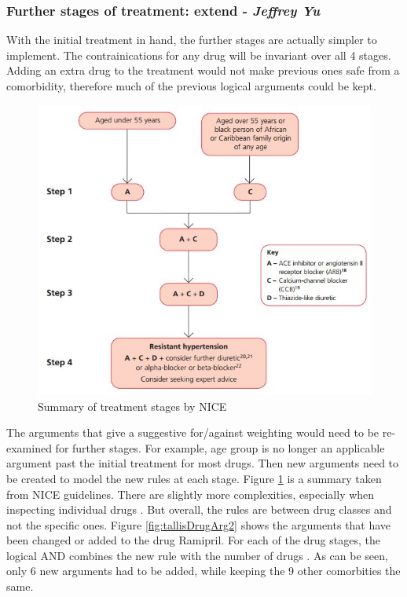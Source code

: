 \documentclass[11pt]{article}
\begin{document}
\clearpage
\subsubsection{Further stages of treatment: extend - \textit{Jeffrey Yu}}  
With the initial treatment in hand, the further stages are actually simpler to implement.  The contrainications for any drug will be invariant over all 4 stages.  Adding an extra drug to the treatment would not make previous ones safe from a comorbidity, therefore much of the previous logical arguments could be kept.

\begin{figure}[ht]
\begin{center}
\includegraphics[scale=0.8]{tallisNewDrug}
\caption{Summary of treatment stages by NICE \cite{NICE}}
\label{fig:tallisNewDrug}
\end{center}
\end{figure}

The arguments that give a suggestive for/against weighting would need to be re-examined for further stages.  For example, age group is no longer an applicable argument past the initial treatment for most drugs.  Then new arguments need to be created to model the new rules at each stage. Figure \ref{fig:tallisNewDrug} is a summary taken from NICE guidelines.  There are slightly more complexities, especially when inspecting individual drugs \cite{CKS}. But overall, the rules are between drug classes and not the specific ones.  Figure \ref{fig:tallisDrugArg2} shows the arguments that have been changed or added to the drug Ramipril.  For each of the drug stages, the logical AND combines the new rule with the number of drugs . As can be seen, only 6 new arguments had to be added, while keeping the 9 other comorbities the same.  
\end{document}
